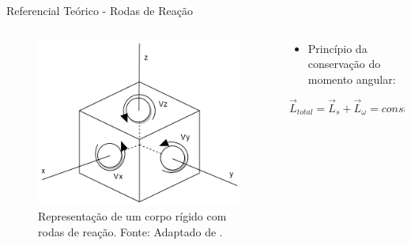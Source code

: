 \documentclass{beamer}
\begin{document}
\begin{frame}{Referencial Teórico - Rodas de Reação}
	\begin{columns}
    \begin{column}{0.50\textwidth}
    \begin{figure}[HT]
		\begin{center}
		\captionsetup{justification=centering}
        \includegraphics[scale=.35]{../referencial/img/satellite_controlhand_p1306}
        \caption{Representação de um corpo rígido com rodas de reação. \newline
        		 Fonte: Adaptado de .}
		\label{FIG_ADAPTATIVO}
        \end{center}
	\end{figure}
    \end{column}
    \begin{column}{0.5\textwidth}

	\begin{itemize}
		\justifying
		\item Princípio da conservação do momento angular:
    \end{itemize}

	\begin{equation}\label{eq:ltot}
		\vec{L}_{total}=\vec{L}_s+\vec{L}_{\omega}=constante 
	\end{equation}

	\end{column}
\end{columns}
\end{frame}
\end{document}
